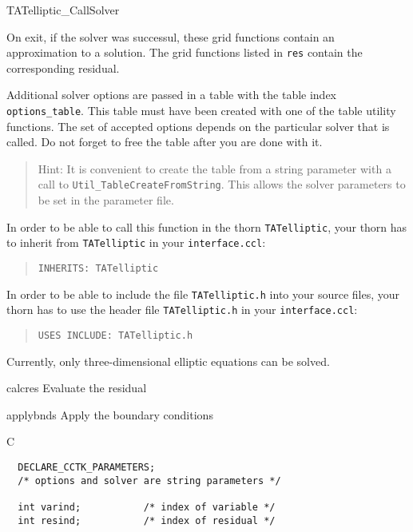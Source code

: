 \begin{FunctionDescription}{TATelliptic\_CallSolver}
\begin{Discussion}
On exit, if the solver was successul, these grid functions contain an
approximation to a solution.  The grid functions listed in
\texttt{res} contain the corresponding residual.

Additional solver options are passed in a table with the table index
\texttt{options\_table}.  This table must have been created with one
of the table utility functions.  The set of accepted options depends
on the particular solver that is called.  Do not forget to free the
table after you are done with it.

\begin{quote}
Hint: It is convenient to create the table from a string parameter
with a call to \texttt{Util\_TableCreateFromString}.  This allows the
solver parameters to be set in the parameter file.
\end{quote}

In order to be able to call this function in the thorn
\texttt{TATelliptic}, your thorn has to inherit from
\texttt{TATelliptic} in your \texttt{interface.ccl}:
\begin{quote}
\texttt{INHERITS: TATelliptic}
\end{quote}

In order to be able to include the file \texttt{TATelliptic.h} into
your source files, your thorn has to use the header file
\texttt{TATelliptic.h} in your \texttt{interface.ccl}:
\begin{quote}
\texttt{USES INCLUDE: TATelliptic.h}
\end{quote}

Currently, only three-dimensional elliptic equations can be solved.
\end{Discussion}

\begin{SeeAlsoSection}
\begin{SeeAlso}{calcres}
Evaluate the residual
\end{SeeAlso}
\begin{SeeAlso}{applybnds}
Apply the boundary conditions
\end{SeeAlso}
\end{SeeAlsoSection}

\begin{ExampleSection}
\begin{Example}{C}
\begin{verbatim}
  DECLARE_CCTK_PARAMETERS;
  /* options and solver are string parameters */
  
  int varind;			/* index of variable */
  int resind;			/* index of residual */
  

\end{verbatim}
\end{Example}
\end{ExampleSection}
\end{FunctionDescription}
